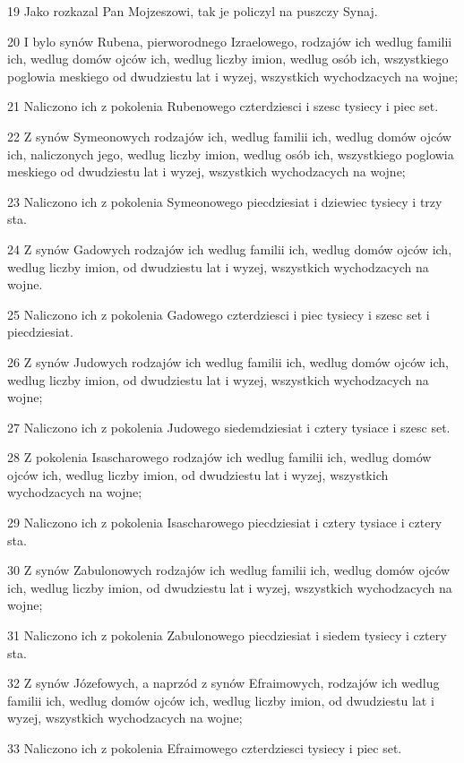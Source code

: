 \par 19 Jako rozkazal Pan Mojzeszowi, tak je policzyl na puszczy Synaj.
\par 20 I bylo synów Rubena, pierworodnego Izraelowego, rodzajów ich wedlug familii ich, wedlug domów ojców ich, wedlug liczby imion, wedlug osób ich, wszystkiego poglowia meskiego od dwudziestu lat i wyzej, wszystkich wychodzacych na wojne;
\par 21 Naliczono ich z pokolenia Rubenowego czterdziesci i szesc tysiecy i piec set.
\par 22 Z synów Symeonowych rodzajów ich, wedlug familii ich, wedlug domów ojców ich, naliczonych jego, wedlug liczby imion, wedlug osób ich, wszystkiego poglowia meskiego od dwudziestu lat i wyzej, wszystkich wychodzacych na wojne;
\par 23 Naliczono ich z pokolenia Symeonowego piecdziesiat i dziewiec tysiecy i trzy sta.
\par 24 Z synów Gadowych rodzajów ich wedlug familii ich, wedlug domów ojców ich, wedlug liczby imion, od dwudziestu lat i wyzej, wszystkich wychodzacych na wojne.
\par 25 Naliczono ich z pokolenia Gadowego czterdziesci i piec tysiecy i szesc set i piecdziesiat.
\par 26 Z synów Judowych rodzajów ich wedlug familii ich, wedlug domów ojców ich, wedlug liczby imion, od dwudziestu lat i wyzej, wszystkich wychodzacych na wojne;
\par 27 Naliczono ich z pokolenia Judowego siedemdziesiat i cztery tysiace i szesc set.
\par 28 Z pokolenia Isascharowego rodzajów ich wedlug familii ich, wedlug domów ojców ich, wedlug liczby imion, od dwudziestu lat i wyzej, wszystkich wychodzacych na wojne;
\par 29 Naliczono ich z pokolenia Isascharowego piecdziesiat i cztery tysiace i cztery sta.
\par 30 Z synów Zabulonowych rodzajów ich wedlug familii ich, wedlug domów ojców ich, wedlug liczby imion, od dwudziestu lat i wyzej, wszystkich wychodzacych na wojne;
\par 31 Naliczono ich z pokolenia Zabulonowego piecdziesiat i siedem tysiecy i cztery sta.
\par 32 Z synów Józefowych, a naprzód z synów Efraimowych, rodzajów ich wedlug familii ich, wedlug domów ojców ich, wedlug liczby imion, od dwudziestu lat i wyzej, wszystkich wychodzacych na wojne;
\par 33 Naliczono ich z pokolenia Efraimowego czterdziesci tysiecy i piec set.

